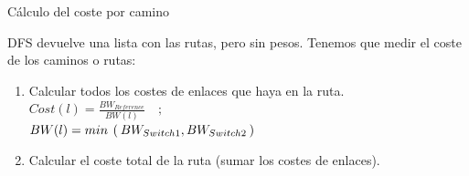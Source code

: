 \documentclass[10pt,spanish,xcolor={svgnames}]{beamer}
\begin{document}
\begin{frame}{Cálculo del coste por camino}
\vspace*{-2em}
\begin{alertblock}{\large DFS devuelve una lista con las rutas, pero sin pesos.}
\vspace*{1em}
Tenemos que medir el coste de los caminos o rutas:
\begin{enumerate}
\item Calcular todos los costes de enlaces que haya en la ruta.\\ \vspace*{0.5em}  {\large $Cost(l) = \frac{BW_{Reference}}{BW(l)}\quad\mathrm{;}\quad$} 
\\ \vspace*{0.5em} {\large $BW(l) = min\hspace{0.4em}(\hspace{0.2em}BW_{Switch1}, BW_{Switch2}\hspace{0.2em})$}
\vspace{1em}
\item Calcular el coste total de la ruta (sumar los costes de enlaces).
\end{enumerate}
\end{alertblock}
\end{frame}
\end{document}
